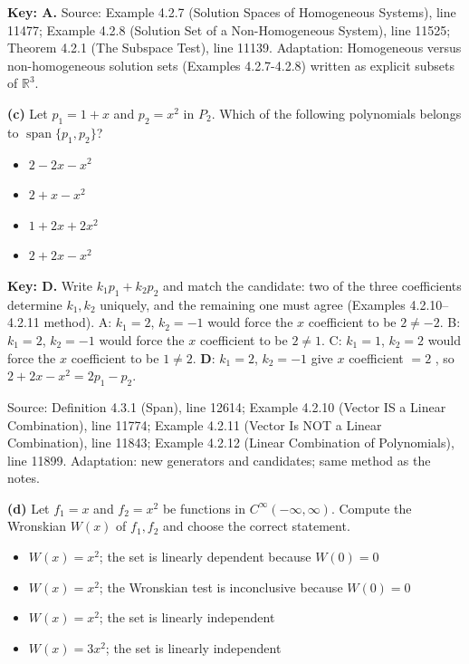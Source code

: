 \documentclass[11pt,a4paper]{article}
\newcommand{\Src}[1]{{\footnotesize\color{black!65}Source: #1}}
\begin{document}
\textbf{Key: A.} \Src{Example 4.2.7 (Solution Spaces of Homogeneous Systems), line 11477; Example 4.2.8 (Solution Set of a Non-Homogeneous System), line 11525; Theorem 4.2.1 (The Subspace Test), line 11139. Adaptation: Homogeneous versus non-homogeneous solution sets (Examples 4.2.7-4.2.8) written as explicit subsets of $\mathbb{R}^3$.}\par
{}\textbf{(c)} Let $p_1=1+x$ and $p_2=x^{2}$ in $P_2$. Which of the following polynomials belongs to $\operatorname{span}\{p_1,p_2\}$?\par
\begin{itemize}[leftmargin=8mm,itemsep=0pt]\item[A] $2-2x-x^{2}$\item[B] $2+x-x^{2}$\item[C] $1+2x+2x^{2}$\item[D$^{\ast}$] $2+2x-x^{2}$\end{itemize}
\textbf{Key: D.} Write $k_1p_1+k_2p_2$ and match the candidate: two of the three coefficients determine $k_1,k_2$ uniquely, and the remaining one must agree (Examples 4.2.10--4.2.11 method). A: $k_1=2$, $k_2=-1$ would force the $x$ coefficient to be $2\neq-2$. B: $k_1=2$, $k_2=-1$ would force the $x$ coefficient to be $2\neq1$. C: $k_1=1$, $k_2=2$ would force the $x$ coefficient to be $1\neq2$. \textbf{D}: $k_1=2$, $k_2=-1$ give $x$ coefficient $=2$ \checkmark, so $2+2x-x^{2}=2p_1-p_2$.\par
\Src{Definition 4.3.1 (Span), line 12614; Example 4.2.10 (Vector IS a Linear Combination), line 11774; Example 4.2.11 (Vector Is NOT a Linear Combination), line 11843; Example 4.2.12 (Linear Combination of Polynomials), line 11899. Adaptation: new generators and candidates; same method as the notes.}\par
{}\textbf{(d)} Let $f_1=x$ and $f_2=x^{2}$ be functions in $C^{\infty}(-\infty,\infty)$. Compute the Wronskian $W(x)$ of $f_1,f_2$ and choose the correct statement.\par
\begin{itemize}[leftmargin=8mm,itemsep=0pt]\item[A] $W(x)=x^{2}$; the set is linearly dependent because $W(0)=0$\item[B] $W(x)=x^{2}$; the Wronskian test is inconclusive because $W(0)=0$\item[C$^{\ast}$] $W(x)=x^{2}$; the set is linearly independent\item[D] $W(x)=3x^{2}$; the set is linearly independent\end{itemize}
\end{document}
